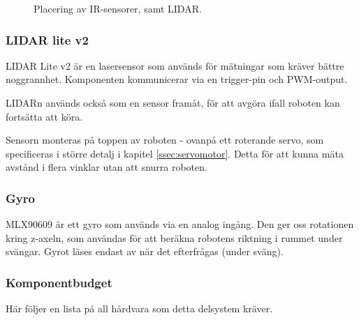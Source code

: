 \documentclass[a4paper,11pt]{article}
\begin{document}
\begin{figure}[h!]
	\caption{Placering av IR-sensorer, samt LIDAR.}
	\label{fig:unitSensorPlacement}
\end{figure}

\subsubsection{LIDAR lite v2} \label{sssec:lidar}
LIDAR Lite v2 är en lasersensor som används för mätningar som kräver bättre noggrannhet. Komponenten kommunicerar via en trigger-pin och PWM-output.

LIDARn används också som en sensor framåt, för att avgöra ifall roboten kan fortsätta att köra.

Sensorn monteras på toppen av roboten - ovanpå ett roterande servo, som specificeras i större detalj i kapitel \ref{ssec:servomotor}. Detta för att kunna mäta avstånd i flera vinklar utan att snurra roboten.

\subsubsection{Gyro} \label{sssec:imu}
MLX90609 är ett gyro som används via en analog ingång. Den ger oss rotationen kring z-axeln, som användas för att beräkna robotens riktning i rummet under svängar.
Gyrot läses endast av när det efterfrågas (under sväng).

\subsubsection{Komponentbudget}
Här följer en lista på all hårdvara som detta delsystem kräver.
\end{document}
